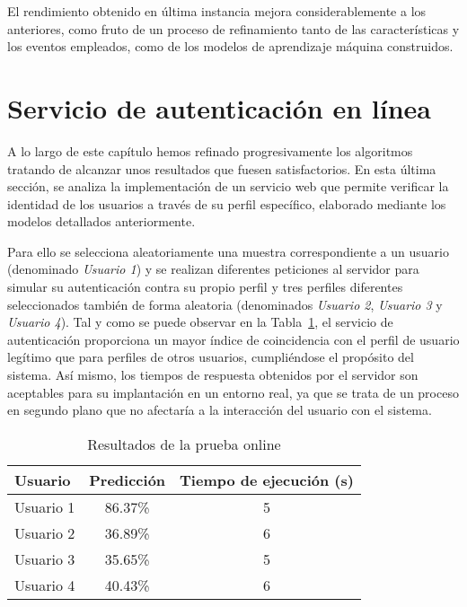 El rendimiento obtenido en última instancia mejora considerablemente a los anteriores, como fruto de un proceso de refinamiento tanto de las características y los eventos empleados, como de los modelos de aprendizaje máquina construidos.

\section{Servicio de autenticación en línea}

A lo largo de este capítulo hemos refinado progresivamente los algoritmos tratando de alcanzar unos resultados que fuesen satisfactorios. En esta última sección, se analiza la implementación de un servicio web que permite verificar la identidad de los usuarios a través de su perfil específico, elaborado mediante los modelos detallados anteriormente. 

Para ello se selecciona aleatoriamente una muestra correspondiente a un usuario (denominado \textit{Usuario 1}) y se realizan diferentes peticiones al servidor para simular su autenticación contra su propio perfil y tres perfiles diferentes seleccionados también de forma aleatoria (denominados \textit{Usuario 2}, \textit{Usuario 3} y \textit{Usuario 4}). Tal y como se puede observar en la Tabla~\ref{tab:online_results}, el servicio de autenticación proporciona un mayor índice de coincidencia con el perfil de usuario legítimo que para perfiles de otros usuarios, cumpliéndose el propósito del sistema. Así mismo, los tiempos de respuesta obtenidos por el servidor son aceptables para su implantación en un entorno real, ya que se trata de un proceso en segundo plano que no afectaría a la interacción del usuario con el sistema.



\begin{table}[!h]
    \centering
    \begin{tabular}{ l c c }
        \toprule
        Usuario & Predicción & Tiempo de ejecución (s) \\
        \midrule
         Usuario 1 & 86.37\%   & 5 \\
         Usuario 2 & 36.89\%   & 6 \\
         Usuario 3 & 35.65\%   & 5 \\
         Usuario 4 & 40.43\%   & 6 \\
        \bottomrule
    \end{tabular}
    \caption{Resultados de la prueba online}
    \label{tab:online_results}
\end{table}





